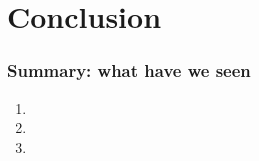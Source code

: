 \section*{Conclusion}
\begin{frame}
  \frametitle{Summary: what have we seen}
  \begin{enumerate}
    \item
    \item
    \item 
  \end{enumerate}
\end{frame}

